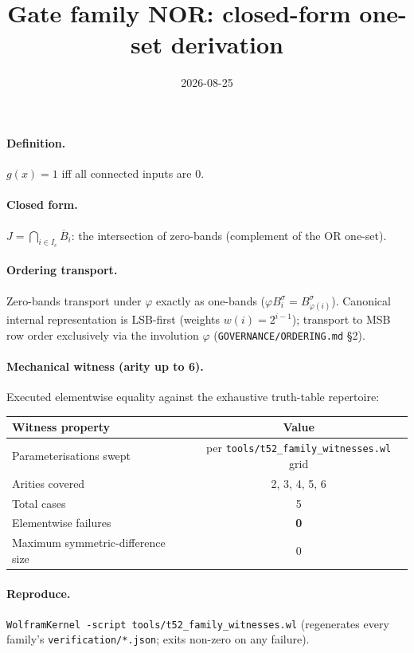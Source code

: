\documentclass{article}
\title{Gate family NOR: closed-form one-set derivation}
\date{2026-08-25}
\begin{document}
\maketitle

\paragraph{Definition.} $g(x)=1$ iff all connected inputs are $0$.

\paragraph{Closed form.} $J=\bigcap_{i\in I_c}\overline{B}_i$: the intersection of zero-bands (complement of the OR one-set).

\paragraph{Ordering transport.} Zero-bands transport under $\varphi$ exactly as one-bands ($\varphi B_i^{\sigma}=B_{\varphi(i)}^{\sigma}$).
Canonical internal representation is LSB-first (weights $w(i)=2^{i-1}$);
transport to MSB row order exclusively via the involution $\varphi$
(\texttt{GOVERNANCE/ORDERING.md} \S2).

\paragraph{Mechanical witness (arity up to 6).} Executed elementwise equality
against the exhaustive truth-table repertoire:
\begin{center}
\begin{tabular}{lc}
\hline
Witness property & Value \\ \hline
Parameterisations swept & per \texttt{tools/t52_family_witnesses.wl} grid \\
Arities covered & 2, 3, 4, 5, 6 \\
Total cases & 5 \\
Elementwise failures & \textbf{0} \\
Maximum symmetric-difference size & 0 \\ \hline
\end{tabular}
\end{center}

\paragraph{Reproduce.} \texttt{WolframKernel -script tools/t52_family_witnesses.wl}
(regenerates every family's \texttt{verification/*.json}; exits non-zero on any failure).
\end{document}
